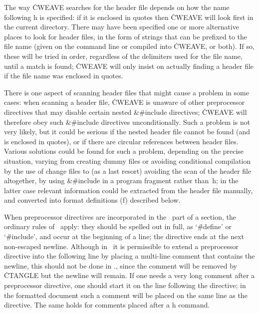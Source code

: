 The way \.{CWEAVE} searches for the header file depends on how the name
following \:h is specified: if it is enclosed in quotes then \.{CWEAVE} will
look first in the current directory. There may have been specified one or
more alternative places to look for header files, in the form of strings
that can be prefixed to the file name (given on the command line or compiled
into \.{CWEAVE}, or both). If so, these will be tried in order, regardless
of the delimiters used for the file name, until a match is found; \.{CWEAVE}
will only insist on actually finding a header file if the file name was
enclosed in quotes.

There is one aspect of scanning header files that might cause a problem in
some cases: when scanning a header file, \.{CWEAVE} is unaware of other
preprocessor directives that may disable certain nested \&{\#include}
directives; \.{CWEAVE} will therefore obey such \&{\#include} directives
unconditionally. Such a problem is not very likely, but it could be serious
if the nested header file cannot be found (and is enclosed in quotes), or if
there are circular references between header files. Various solutions could
be found for such a problem, depending on the precise situation, varying
from creating dummy files or avoiding conditional compilation by the use of
change files to (as a last resort) avoiding the scan of the header file
altogether, by using \&{\#include} in a program fragment rather than~\:h; in
the latter case relevant information could be extracted from the header
file manually, and converted into format definitions (\:f) described below.

When preprocessor directives are incorporated in the \Cee~part of a section,
the ordinary rules of \Cee\ apply: they should be spelled out in full, as
`\.{\#define}' or `\.{\#include}', and occur at the beginning of a line; the
directive ends at the next non-escaped newline. Although in \Cee\ it is
permissible to extend a preprocessor directive into the following line by
placing a multi-line comment that contains the newline, this should not be
done in \CWEB., since the comment will be removed by \.{CTANGLE} but the
newline will remain. If one needs a very long comment after a preprocessor
directive, one should start it on the line following the directive; in the
formatted document such a comment will be placed on the same line as the
directive. The same holds for comments placed after a \:h command.

